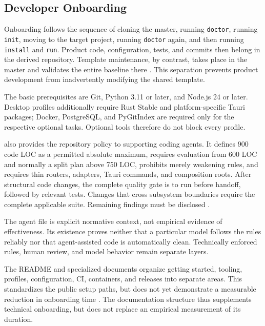 \subsection{Developer Onboarding}
\label{subsec:entwickler-onboarding}

Onboarding follows the sequence of cloning the master, running
\texttt{doctor}, running \texttt{init}, moving to the target project, running
\texttt{doctor} again, and then running \texttt{install} and \texttt{run}.
Product code, configuration, tests, and commits then belong in the derived
repository.
Template maintenance, by contrast, takes place in the master and validates the
entire baseline there
\parencite{kleiveist2026governance-snapshot,kleiveist2026profiles}.
This separation prevents product development from inadvertently modifying the
shared template.

The basic prerequisites are Git, Python 3.11 or later, and Node.js 24 or later.
Desktop profiles additionally require Rust Stable and platform-specific Tauri
packages; Docker, PostgreSQL, and PyGitIndex are required only for the
respective optional tasks. Optional tools therefore do not block every
profile.

 also provides the repository policy to supporting coding
agents. It defines 900 code LOC as a permitted absolute maximum, requires
evaluation from 600 LOC and normally a split plan above 750 LOC, prohibits
merely weakening rules, and requires thin routers, adapters, Tauri commands,
and composition roots. After structural code changes, the complete quality
gate is to run before handoff, followed by relevant tests. Changes that cross
subsystem boundaries require the complete applicable suite. Remaining findings
must be disclosed \parencite{kleiveist2026agents}.

The agent file is explicit normative context, not empirical evidence of
effectiveness. Its existence proves neither that a particular model follows
the rules reliably nor that agent-assisted code is automatically clean.
Technically enforced rules, human review, and model behavior remain separate
layers.

The README and specialized documents organize getting started, tooling,
profiles, configuration, CI, containers, and releases into separate areas.
This standardizes the public setup paths, but does not yet demonstrate a
measurable reduction in onboarding time
\parencite{kleiveist2026tooling,kleiveist2026configuration,kleiveist2026ci,kleiveist2026release}.
The documentation structure thus supplements technical onboarding, but does
not replace an empirical measurement of its duration.
